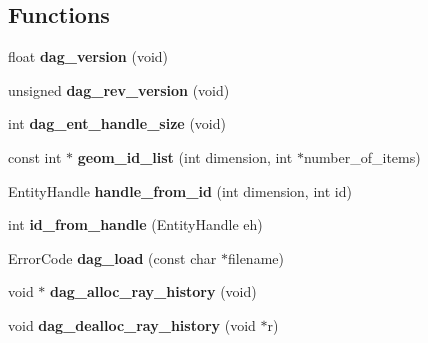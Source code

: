 \subsection*{Functions}
\begin{DoxyCompactItemize}
\item 
\hypertarget{namespacepyne_a2213248fb59d53de02ff3317321f35a1}{float {\bfseries dag\+\_\+version} (void)}\label{namespacepyne_a2213248fb59d53de02ff3317321f35a1}

\item 
\hypertarget{namespacepyne_a3a4f252b82e4290ee8c9e82a8db38da6}{unsigned {\bfseries dag\+\_\+rev\+\_\+version} (void)}\label{namespacepyne_a3a4f252b82e4290ee8c9e82a8db38da6}

\item 
\hypertarget{namespacepyne_a258aedf1cd43d592c20dc7527db14fc1}{int {\bfseries dag\+\_\+ent\+\_\+handle\+\_\+size} (void)}\label{namespacepyne_a258aedf1cd43d592c20dc7527db14fc1}

\item 
\hypertarget{namespacepyne_a947c94bdefb6541c33439817b5293ef9}{const int $\ast$ {\bfseries geom\+\_\+id\+\_\+list} (int dimension, int $\ast$number\+\_\+of\+\_\+items)}\label{namespacepyne_a947c94bdefb6541c33439817b5293ef9}

\item 
\hypertarget{namespacepyne_a793858138da0f88a32c4b03401bef215}{Entity\+Handle {\bfseries handle\+\_\+from\+\_\+id} (int dimension, int id)}\label{namespacepyne_a793858138da0f88a32c4b03401bef215}

\item 
\hypertarget{namespacepyne_ac13399f54545bd88502c3cb7e2fae4c3}{int {\bfseries id\+\_\+from\+\_\+handle} (Entity\+Handle eh)}\label{namespacepyne_ac13399f54545bd88502c3cb7e2fae4c3}

\item 
\hypertarget{namespacepyne_ae29cb4ffcd3fea6fbb2b6418cdb0b42d}{Error\+Code {\bfseries dag\+\_\+load} (const char $\ast$filename)}\label{namespacepyne_ae29cb4ffcd3fea6fbb2b6418cdb0b42d}

\item 
\hypertarget{namespacepyne_afa68eb50ccf4aa327937219dd3c05e02}{void $\ast$ {\bfseries dag\+\_\+alloc\+\_\+ray\+\_\+history} (void)}\label{namespacepyne_afa68eb50ccf4aa327937219dd3c05e02}

\item 
\hypertarget{namespacepyne_a9243f772bbf6b63bac405c28328dd253}{void {\bfseries dag\+\_\+dealloc\+\_\+ray\+\_\+history} (void $\ast$r)}\label{namespacepyne_a9243f772bbf6b63bac405c28328dd253}


\end{DoxyCompactItemize}
